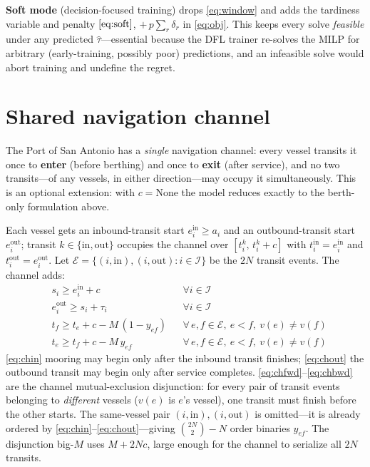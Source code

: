 \documentclass[11pt]{article}
\newcommand{\I}{\mathcal{I}}
\newcommand{\bigM}{M}
\begin{document}
\textbf{Soft mode} (decision-focused training) drops \eqref{eq:window} and adds
the tardiness variable and penalty $\eqref{eq:soft}$, $+\,p\sum_r\delta_r$ in
\eqref{eq:obj}. This keeps every solve \emph{feasible} under any predicted
$\hat\tau$---essential because the DFL trainer re-solves the MILP for arbitrary
(early-training, possibly poor) predictions, and an infeasible solve would abort
training and undefine the regret.

\section{Shared navigation channel}\label{sec:channel}
The Port of San Antonio has a \emph{single} navigation channel: every vessel
transits it once to \textbf{enter} (before berthing) and once to \textbf{exit}
(after service), and no two transits---of any vessels, in either
direction---may occupy it simultaneously. This is an optional extension: with
$c=\text{None}$ the model reduces exactly to the berth-only formulation above.

Each vessel gets an inbound-transit start $e^{\mathrm{in}}_i\ge a_i$ and an
outbound-transit start $e^{\mathrm{out}}_i$; transit $k\in\{\mathrm{in},
\mathrm{out}\}$ occupies the channel over $[t^k_i,\,t^k_i+c]$ with
$t^{\mathrm{in}}_i=e^{\mathrm{in}}_i$ and $t^{\mathrm{out}}_i=e^{\mathrm{out}}_i$.
Let $\mathcal{E}=\{(i,\mathrm{in}),(i,\mathrm{out}):i\in\I\}$ be the $2N$ transit
events. The channel adds:
\begin{align}
& s_i \ge e^{\mathrm{in}}_i + c && \forall i\in\I \label{eq:chin}\\
& e^{\mathrm{out}}_i \ge s_i + \tau_i && \forall i\in\I \label{eq:chout}\\
& t_f \ge t_e + c - \bigM\,(1-y_{ef}) && \forall\, e,f\in\mathcal{E},\ e<f,\ v(e)\ne v(f) \label{eq:chfwd}\\
& t_e \ge t_f + c - \bigM\,y_{ef} && \forall\, e,f\in\mathcal{E},\ e<f,\ v(e)\ne v(f) \label{eq:chbwd}
\end{align}
\eqref{eq:chin} mooring may begin only after the inbound transit finishes;
\eqref{eq:chout} the outbound transit may begin only after service completes.
\eqref{eq:chfwd}--\eqref{eq:chbwd} are the channel mutual-exclusion disjunction:
for every pair of transit events belonging to \emph{different} vessels ($v(e)$ is
$e$'s vessel), one transit must finish before the other starts. The same-vessel
pair $(i,\mathrm{in}),(i,\mathrm{out})$ is omitted---it is already ordered by
\eqref{eq:chin}--\eqref{eq:chout}---giving $\binom{2N}{2}-N$ order binaries
$y_{ef}$. The disjunction big-$M$ uses $\bigM+2Nc$, large enough for the channel
to serialize all $2N$ transits.
\end{document}
